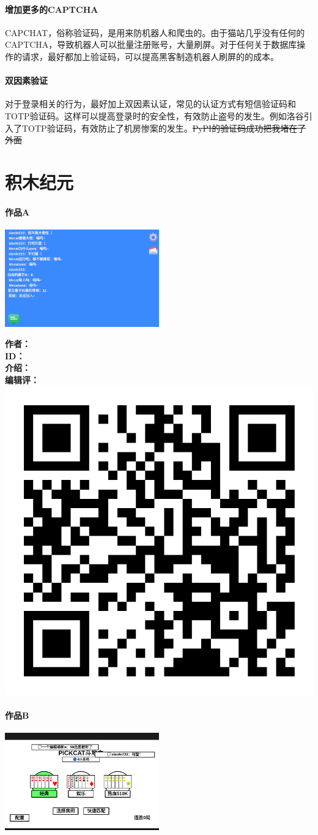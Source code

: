 \documentclass[UTF8,fontset=fandol]{ctexart}
\begin{document}
\subsection{增加更多的CAPTCHA}
CAPCHAT，俗称验证码，是用来防机器人和爬虫的。由于猫站几乎没有任何的CAPTCHA，导致机器人可以批量注册账号，大量刷屏。对于任何关于数据库操作的请求，最好都加上验证码，可以提高黑客制造机器人刷屏的的成本。
\subsection{双因素验证}
对于登录相关的行为，最好加上双因素认证，常见的认证方式有短信验证码和TOTP验证码。这样可以提高登录时的安全性，有效防止盗号的发生。例如洛谷引入了TOTP验证码，有效防止了机房惨案的发生。\sout{PyPI的验证码成功把我堵在了外面}
\pagebreak

\part{积木纪元}
\subsection{作品A}
\includegraphics[width=0.5\textwidth]{assets/01/kitten-1.png}

\noindent
\textbf{作者：} \\
\textbf{ID：} \\
\textbf{介绍：} \\
\textbf{编辑评：}
\hfill\includegraphics[width=0.08\columnwidth]{assets/01/kitten-1-qrc.png}
\subsection{作品B}
\includegraphics[width=0.5\textwidth]{assets/01/kitten-2.png}
\end{document}
